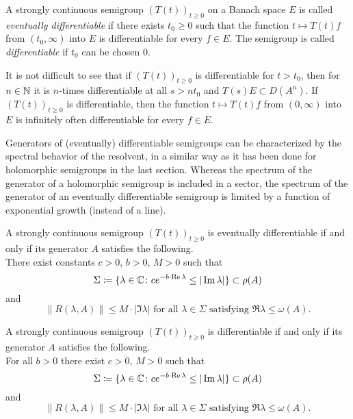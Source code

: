 \begin{definition}\label{def:a2-1.16}
A strongly continuous semigroup $(T(t))_{t \geq 0}$ on a Banach space $E$ is called \emph{eventually differentiable} if there exists $t_0 \geq 0$ such that the function $t \mapsto T(t)f$ from $(t_0,\infty)$ into $E$ is differentiable for every $f \in E$.
The semigroup is called \emph{differentiable} if $t_0$ can be chosen $0$.
\end{definition}

It is not difficult to see that if $(T(t))_{t \geq 0}$ is differentiable for $t > t_{0}$, then for $n \in \mathbb{N}$ it is $n$-times differentiable at all $s > nt_{0}$ and $T(s)E \subset D(A^n)$. 
If $(T(t))_{t\geq 0}$ is differentiable, then the function $t \mapsto T(t)f$ from $(0,\infty)$ into $E$ is infinitely often differentiable for every $f \in E$.

Generators of (eventually) differentiable semigroups 
can be characterized by the spectral behavior of the resolvent,
in a similar way as it has been done for holomorphic semigroups in the last section.
Whereas the spectrum of the generator of a holomorphic semigroup is included in a sector, the spectrum of the generator of an eventually differentiable semigroup is limited by a function of exponential growth (instead of a line).
\begin{theorem}\label{thm:a2-1.17}
A strongly continuous semigroup $(T(t))_{t\geq 0}$ is eventually differentiable if and only if its generator $A$ satisfies the following. \\
There exist constants $c>0$, $b>0$, $M>0$ such that
\[
    \Sigma \coloneqq \{\lambda \in \mathbb{C} \colon ce^{-b\cdot \mathop{}\!\mathrm{Re}\,\lambda} \leq |\mathop{}\!\mathrm{Im}\,\lambda|\} \subset \rho(A)
\]
and
\[
    \|R(\lambda,A)\| \leq M\cdot|\Im\lambda| \text{ for all } \lambda \in \Sigma \text{ satisfying } \Re\lambda \leq \omega(A).
\]
\end{theorem}

\begin{theorem}\label{thm:a2-1.18}
A strongly continuous semigroup $(T(t))_{t\geq 0}$ is differentiable if and only if its generator $A$ satisfies the following. \\
For all $b>0$ there exist $c>0$, $M>0$ such that
\[
    \Sigma \coloneqq \{\lambda \in \mathbb{C} \colon ce^{-b\cdot \mathop{}\!\mathrm{Re}\,\lambda} \leq |\mathop{}\!\mathrm{Im}\,\lambda|\} \subset \rho(A)
\]
and
\[
    \|R(\lambda,A)\| \leq M\cdot|\Im\lambda| \text{ for all } \lambda \in \Sigma \text{ satisfying } \Re\lambda \leq \omega(A).
\]
\end{theorem}

